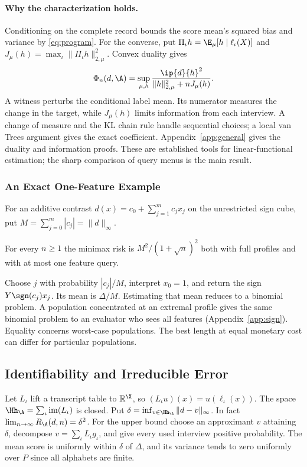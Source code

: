 \paragraph{Why the characterization holds.}
Conditioning on the complete record bounds the score mean's squared bias and variance by \eqref{eq:program}. For the converse, put $\Pi_\iota h=\E_\mu[h\mid\ell_\iota(X)]$ and $J_\mu(h)=\max_\iota\|\Pi_\iota h\|_{2,\mu}^2$. Convex duality gives
\begin{equation}
 \Phi_n(d,\A)=\sup_{\mu,h}
 \frac{\ip{d}{h}^2}{\|h\|_{2,\mu}^2+nJ_\mu(h)}.\label{eq:dual}
\end{equation}
A witness perturbs the conditional label mean. Its numerator measures the change in the target, while $J_\mu(h)$ limits information from each interview. A change of measure and the KL chain rule handle sequential choices; a local van Trees argument gives the exact coefficient. Appendix~\ref{app:general} gives the duality and information proofs. These are established tools for linear-functional estimation; the sharp comparison of query menus is the main result.

\subsubsection{An Exact One-Feature Example}
For an additive contrast $d(x)=c_0+\sum_{j=1}^m c_j x_j$ on the unrestricted sign cube, put $M=\sum_{j=0}^m |c_j|=\|d\|_\infty$.
\begin{proposition}\label{prop:add}
For every $n\ge1$ the minimax risk is $M^2/(1+\sqrt n)^2$ both with full profiles and with at most one feature query.
\end{proposition}
Choose $j$ with probability $|c_j|/M$, interpret $x_0=1$, and return the sign $Y\sgn(c_j)x_j$. Its mean is $\Delta/M$. Estimating that mean reduces to a binomial problem. A population concentrated at an extremal profile gives the same binomial problem to an evaluator who sees all features (Appendix~\ref{app:sign}). Equality concerns worst-case populations. The best length at equal monetary cost can differ for particular populations.



\subsection{Identifiability and Irreducible Error}\label{app:id}
Let $L_\iota$ lift a transcript table to $\mathbb R^{\X}$, so $(L_\iota u)(x)=u(\ell_\iota(x))$. The space $\Hh_\A=\sum_\iota\mathrm{im}(L_\iota)$ is closed. Put $\delta=\inf_{v\in\Hh_\A}\|d-v\|_\infty$. In fact $\lim_{n\to\infty} R_\A(d,n)=\delta^2$. For the upper bound choose an approximant $v$ attaining $\delta$, decompose $v=\sum_\iota L_\iota g_\iota$, and give every used interview positive probability. The mean score is uniformly within $\delta$ of $\Delta$, and its variance tends to zero uniformly over $P$ since all alphabets are finite.

